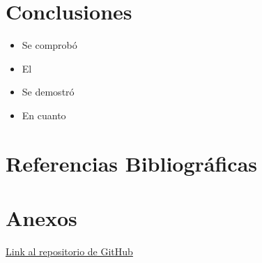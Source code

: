 \documentclass[conference,onecolumn,12pt]{IEEEtran}
\numberwithin{equation}{subsection}
\begin{document}
\section{Conclusiones} 

\begin{itemize}

\item Se comprobó 

\item El 

\item Se demostró 

\item  En cuanto

\end{itemize}


\section{Referencias Bibliográficas}
\printbibliography[heading=none]

\section{Anexos}

\href{https://github.com/NagelMS/Tarea2_CE2.git}{Link al repositorio de GitHub}
\end{document}
